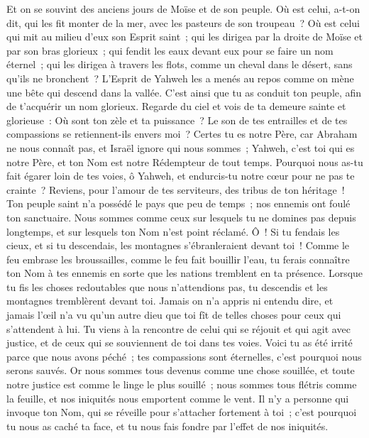 \begin{multicols}{2}
Et on se souvint des anciens jours de Moïse et de son peuple. Où est celui, a-t-on dit, qui les fit monter de la mer, avec les pasteurs de son troupeau~? Où est celui qui mit au milieu d'eux son Esprit saint~;
qui les dirigea par la droite de Moïse et par son bras glorieux~; qui fendit les eaux devant eux pour se faire un nom éternel~;
qui les dirigea à travers les flots, comme un cheval dans le désert, sans qu'ils ne bronchent~?
L'Esprit de Yahweh les a menés au repos comme on mène une bête qui descend dans la vallée. C'est ainsi que tu as conduit ton peuple, afin de t'acquérir un nom glorieux.
Regarde du ciel et vois de ta demeure sainte et glorieuse~: Où sont ton zèle et ta puissance~? Le son de tes entrailles et de tes compassions se retiennent-ils envers moi~?
Certes tu es notre Père, car Abraham ne nous connaît pas, et Israël ignore qui nous sommes~; Yahweh, c'est toi qui es notre Père, et ton Nom est notre Rédempteur de tout temps.
Pourquoi nous as-tu fait égarer loin de tes voies, ô Yahweh, et endurcis-tu notre cœur pour ne pas te crainte~? Reviens, pour l'amour de tes serviteurs, des tribus de ton héritage~!
Ton peuple saint n'a possédé le pays que peu de temps~; nos ennemis ont foulé ton sanctuaire.
Nous sommes comme ceux sur lesquels tu ne domines pas depuis longtemps, et sur lesquels ton Nom n'est point réclamé. Ô~! Si tu fendais les cieux, et si tu descendais, les montagnes s'ébranleraient devant toi~!
\VerseOne{}Comme le feu embrase les broussailles, comme le feu fait bouillir l'eau, tu ferais connaître ton Nom à tes ennemis en sorte que les nations tremblent en ta présence.
Lorsque tu fis les choses redoutables que nous n'attendions pas, tu descendis et les montagnes tremblèrent devant toi.
Jamais on n'a appris ni entendu dire, et jamais l'œil n'a vu qu'un autre dieu que toi fît de telles choses pour ceux qui s'attendent à lui.
Tu viens à la rencontre de celui qui se réjouit et qui agit avec justice, et de ceux qui se souviennent de toi dans tes voies. Voici tu as été irrité parce que nous avons péché~; tes compassions sont éternelles, c'est pourquoi nous serons sauvés.
Or nous sommes tous devenus comme une chose souillée, et toute notre justice est comme le linge le plus souillé~; nous sommes tous flétris comme la feuille, et nos iniquités nous emportent comme le vent.
Il n'y a personne qui invoque ton Nom, qui se réveille pour s'attacher fortement à toi~; c'est pourquoi tu nous as caché ta face, et tu nous fais fondre par l'effet de nos iniquités.

\end{multicols}
